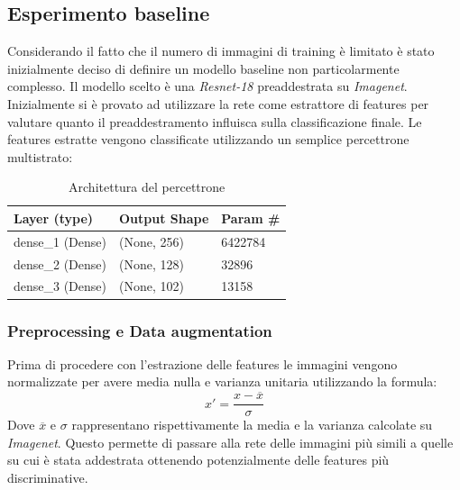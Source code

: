\subsection{Esperimento baseline}
Considerando il fatto che il numero di immagini di training è limitato è stato inizialmente deciso di definire un modello baseline non particolarmente complesso. Il modello scelto è una \textit{Resnet-18} preaddestrata su \textit{Imagenet}. Inizialmente si è provato ad utilizzare la rete come estrattore di features per valutare quanto il preaddestramento influisca sulla classificazione finale. 
Le features estratte vengono classificate utilizzando un semplice percettrone multistrato:
\begin{table}[H]
\centering
\begin{tabular}{lll}
\hline
Layer (type)     & Output Shape & Param \# \\ \hline
dense\_1 (Dense) & (None, 256)  & 6422784  \\ \hline
dense\_2 (Dense) & (None, 128)  & 32896    \\ \hline
dense\_3 (Dense) & (None, 102)  & 13158    \\ \hline
\end{tabular}
\label{t_mlp}
\caption{Architettura del percettrone}
\end{table}
\subsubsection{Preprocessing e Data augmentation}
Prima di procedere con l'estrazione delle features le immagini vengono normalizzate per avere media nulla e varianza unitaria utilizzando la formula:
\begin{equation}
x' = \frac{x - \overline{x}}{\sigma}
\end{equation}
Dove $ \overline{x} $ e $ \sigma $ rappresentano rispettivamente la media e la varianza calcolate su \textit{Imagenet}.
Questo permette di passare alla rete delle immagini più simili a quelle su cui è stata addestrata ottenendo potenzialmente delle features più discriminative.
